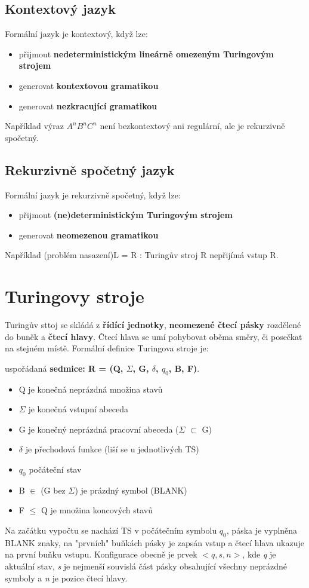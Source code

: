 \documentclass{szzclass}
\begin{document}
\subsection{Kontextový jazyk}
Formální jazyk je kontextový, když lze:
\begin{itemize}
\item přijmout \textbf{nedeterministickým lineárně omezeným Turingovým strojem}
\item generovat \textbf{kontextovou gramatikou}
\item generovat \textbf{nezkracující gramatikou}
\end{itemize}
Například výraz $A^nB^nC^n$ není bezkontextový ani regulární, ale je rekurzivně spočetný.

\subsection{Rekurzivně spočetný jazyk}
Formální jazyk je rekurzivně spočetný, když lze:
\begin{itemize}
\item přijmout \textbf{(ne)deterministickým Turingovým strojem}
\item generovat \textbf{neomezenou gramatikou}
\end{itemize}
Například (problém nasazení)L = {R : Turingův stroj R nepřijímá vstup R}.

\section{Turingovy stroje}
Turingův sttoj se skládá z \textbf{řídící jednotky}, \textbf{neomezené čtecí pásky} rozdělené do buněk a \textbf{čtecí hlavy}.
Čtecí hlava se umí pohybovat oběma směry, či posečkat na stejném místě.
\newline
Formální definice Turingova stroje je:

uspořádaná \textbf{sedmice: R = (Q, $\Sigma$, G, $\delta$, $q_0$, B, F)}.
\begin{itemize}
\item Q je konečná neprázdná množina stavů
\item $\Sigma$ je konečná vstupní abeceda
\item G je konečný neprázdná pracovní abeceda ($\Sigma$ $\subset$ G)
\item $\delta$ je přechodová funkce (liší se u jednotlivých TS)
\item $q_0$ počáteční stav
\item B $\in$ (G bez $\Sigma$) je prázdný symbol (BLANK)
\item F $\leq$ Q je množina koncových stavů
\end{itemize}
Na začátku vypočtu se nachází TS v počátečním symbolu $q_0$, páska je vyplněna BLANK znaky, na "prvních" buňkách pásky je zapsán vstup a čtecí hlava ukazuje na první buňku vstupu.
\newline
Konfigurace obecně je prvek $<q,s,n>$, kde \textit{q} je aktuální stav, \textit{s} je nejmenší souvislá část pásky obsahující všechny neprázdné symboly a \textit{n} je pozice čtecí hlavy.
\end{document}
